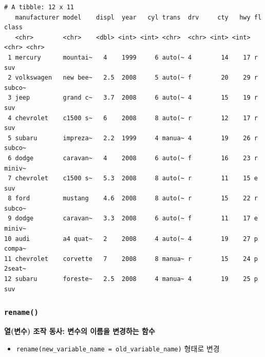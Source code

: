 \documentclass[
  11pt,
]{krantz}
\makeatletter
\newenvironment{Shaded}{\begin{snugshade}}{\end{snugshade}}
\newcommand{\CommentTok}[1]{\textcolor[rgb]{0.37,0.37,0.37}{\textit{#1}}}
\newcommand{\FloatTok}[1]{\textcolor[rgb]{0.06,0.06,0.06}{#1}}
\newcommand{\KeywordTok}[1]{\textcolor[rgb]{0.27,0.27,0.27}{\textbf{#1}}}
\newcommand{\NormalTok}[1]{#1}
\newcommand{\OperatorTok}[1]{\textcolor[rgb]{0.43,0.43,0.43}{\textbf{#1}}}
\newcommand{\StringTok}[1]{\textcolor[rgb]{0.5,0.5,0.5}{#1}}
\providecommand{\tightlist}{%
  \setlength{\itemsep}{0pt}\setlength{\parskip}{0pt}}
\newenvironment{kframe}{%
\medskip{}
\setlength{\fboxsep}{.8em}
 \def\at@end@of@kframe{}%
 \ifinner\ifhmode%
  \def\at@end@of@kframe{\end{minipage}}%
  \begin{minipage}{\columnwidth}%
 \fi\fi%
 \def\FrameCommand##1{\hskip\@totalleftmargin \hskip-\fboxsep
 \colorbox{shadecolor}{##1}\hskip-\fboxsep
     \hskip-\linewidth \hskip-\@totalleftmargin \hskip\columnwidth}%
 \MakeFramed {\advance\hsize-\width
   \@totalleftmargin\z@ \linewidth\hsize
   \@setminipage}}%
 {\par\unskip\endMakeFramed%
 \at@end@of@kframe}
\renewenvironment{quote}{\begin{kframe}}{\end{kframe}}
\makeatother
\begin{document}
\begin{Shaded}
\end{Shaded}

\begin{verbatim}
# A tibble: 12 x 11
   manufacturer model    displ  year   cyl trans  drv     cty   hwy fl    class 
   <chr>        <chr>    <dbl> <int> <int> <chr>  <chr> <int> <int> <chr> <chr> 
 1 mercury      mountai~   4    1999     6 auto(~ 4        14    17 r     suv   
 2 volkswagen   new bee~   2.5  2008     5 auto(~ f        20    29 r     subco~
 3 jeep         grand c~   3.7  2008     6 auto(~ 4        15    19 r     suv   
 4 chevrolet    c1500 s~   6    2008     8 auto(~ r        12    17 r     suv   
 5 subaru       impreza~   2.2  1999     4 manua~ 4        19    26 r     subco~
 6 dodge        caravan~   4    2008     6 auto(~ f        16    23 r     miniv~
 7 chevrolet    c1500 s~   5.3  2008     8 auto(~ r        11    15 e     suv   
 8 ford         mustang    4.6  2008     8 auto(~ r        15    22 r     subco~
 9 dodge        caravan~   3.3  2008     6 auto(~ f        11    17 e     miniv~
10 audi         a4 quat~   2    2008     4 auto(~ 4        19    27 p     compa~
11 chevrolet    corvette   7    2008     8 manua~ r        15    24 p     2seat~
12 subaru       foreste~   2.5  2008     4 manua~ 4        19    25 p     suv   
\end{verbatim}

\normalsize

\hypertarget{dplyr-rename}{%
\subsubsection*{\texorpdfstring{\texttt{rename()}}{rename()}}\label{dplyr-rename}}


\begin{quote}
\textbf{열(변수) 조작 동사: 변수의 이름을 변경하는 함수}
\end{quote}

\begin{itemize}
\tightlist
\item
  \texttt{rename(new\_variable\_name\ =\ old\_variable\_name)} 형태로 변경
\end{itemize}
\end{document}
